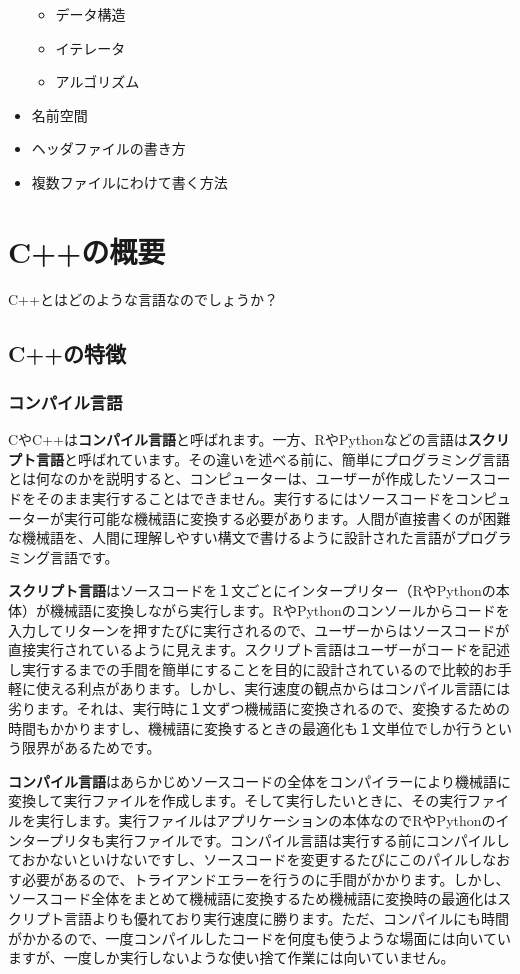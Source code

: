 \documentclass[]{book}
\providecommand{\tightlist}{%
  \setlength{\itemsep}{0pt}\setlength{\parskip}{0pt}}
\begin{document}
\begin{itemize}
  \begin{itemize}
  \tightlist
  \item
    データ構造
  \item
    イテレータ
  \item
    アルゴリズム
  \end{itemize}
\item
  名前空間
\item
  ヘッダファイルの書き方
\item
  複数ファイルにわけて書く方法
\end{itemize}

\chapter{C++の概要}\label{c}

C++とはどのような言語なのでしょうか？

\section{C++の特徴}\label{c}

\subsection{コンパイル言語}

CやC++は\textbf{コンパイル言語}と呼ばれます。一方、RやPythonなどの言語は\textbf{スクリプト言語}と呼ばれています。その違いを述べる前に、簡単にプログラミング言語とは何なのかを説明すると、コンピューターは、ユーザーが作成したソースコードをそのまま実行することはできません。実行するにはソースコードをコンピューターが実行可能な機械語に変換する必要があります。人間が直接書くのが困難な機械語を、人間に理解しやすい構文で書けるように設計された言語がプログラミング言語です。

\textbf{スクリプト言語}はソースコードを１文ごとにインタープリター（RやPythonの本体）が機械語に変換しながら実行します。RやPythonのコンソールからコードを入力してリターンを押すたびに実行されるので、ユーザーからはソースコードが直接実行されているように見えます。スクリプト言語はユーザーがコードを記述し実行するまでの手間を簡単にすることを目的に設計されているので比較的お手軽に使える利点があります。しかし、実行速度の観点からはコンパイル言語には劣ります。それは、実行時に１文ずつ機械語に変換されるので、変換するための時間もかかりますし、機械語に変換するときの最適化も１文単位でしか行うという限界があるためです。

\textbf{コンパイル言語}はあらかじめソースコードの全体をコンパイラーにより機械語に変換して実行ファイルを作成します。そして実行したいときに、その実行ファイルを実行します。実行ファイルはアプリケーションの本体なのでRやPythonのインタープリタも実行ファイルです。コンパイル言語は実行する前にコンパイルしておかないといけないですし、ソースコードを変更するたびにこのパイルしなおす必要があるので、トライアンドエラーを行うのに手間がかかります。しかし、ソースコード全体をまとめて機械語に変換するため機械語に変換時の最適化はスクリプト言語よりも優れており実行速度に勝ります。ただ、コンパイルにも時間がかかるので、一度コンパイルしたコードを何度も使うような場面には向いていますが、一度しか実行しないような使い捨て作業には向いていません。
\end{document}
